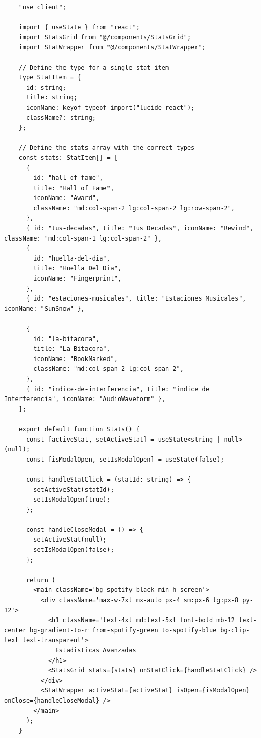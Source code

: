 \begin{ifalgorithm}[H]
    \begin{lstlisting}
    "use client";

    import { useState } from "react";
    import StatsGrid from "@/components/StatsGrid";
    import StatWrapper from "@/components/StatWrapper";

    // Define the type for a single stat item
    type StatItem = {
      id: string;
      title: string;
      iconName: keyof typeof import("lucide-react");
      className?: string;
    };

    // Define the stats array with the correct types
    const stats: StatItem[] = [
      {
        id: "hall-of-fame",
        title: "Hall of Fame",
        iconName: "Award",
        className: "md:col-span-2 lg:col-span-2 lg:row-span-2",
      },
      { id: "tus-decadas", title: "Tus Decadas", iconName: "Rewind", className: "md:col-span-1 lg:col-span-2" },
      {
        id: "huella-del-dia",
        title: "Huella Del Dia",
        iconName: "Fingerprint",
      },
      { id: "estaciones-musicales", title: "Estaciones Musicales", iconName: "SunSnow" },

      {
        id: "la-bitacora",
        title: "La Bitacora",
        iconName: "BookMarked",
        className: "md:col-span-2 lg:col-span-2",
      },
      { id: "indice-de-interferencia", title: "indice de Interferencia", iconName: "AudioWaveform" },
    ];

    export default function Stats() {
      const [activeStat, setActiveStat] = useState<string | null>(null);
      const [isModalOpen, setIsModalOpen] = useState(false);

      const handleStatClick = (statId: string) => {
        setActiveStat(statId);
        setIsModalOpen(true);
      };

      const handleCloseModal = () => {
        setActiveStat(null);
        setIsModalOpen(false);
      };

      return (
        <main className='bg-spotify-black min-h-screen'>
          <div className='max-w-7xl mx-auto px-4 sm:px-6 lg:px-8 py-12'>
            <h1 className='text-4xl md:text-5xl font-bold mb-12 text-center bg-gradient-to-r from-spotify-green to-spotify-blue bg-clip-text text-transparent'>
              Estadisticas Avanzadas
            </h1>
            <StatsGrid stats={stats} onStatClick={handleStatClick} />
          </div>
          <StatWrapper activeStat={activeStat} isOpen={isModalOpen} onClose={handleCloseModal} />
        </main>
      );
    }
    \end{lstlisting}
    \caption{Definición del componente \texttt{Stats}, encargado de gestionar y renderizar la interfaz de las estadísticas avanzadas.}
    \label{alg:stats_component}
\end{ifalgorithm}

